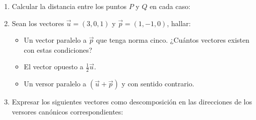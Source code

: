 \documentclass[11pt]{article}
\begin{document}
\begin{enumerate}[\hspace{-3mm}$1)$]
\item  Calcular la distancia entre los puntos $P$ y $Q$ en cada caso:

    \begin{enumerate}[a) ]
    \end{enumerate}






    

\item  Sean los vectores $\vec{u} = (3, 0, 1)$ y $\vec{p} = (1, -1, 0)$, hallar:

    \begin{itemize}
        \item[a)] Un vector paralelo a $\vec{p}$ que tenga norma cinco. ¿Cuántos vectores existen con estas condiciones?
        \item[b)] El vector opuesto a $\frac{1}{2}\vec{u}$.
        \item[c)] Un versor paralelo a $(\vec{u} + \vec{p})$ y con sentido contrario.
    \end{itemize}








\item  Expresar los siguientes vectores como descomposición en las direcciones de los versores canónicos correspondientes:

    \begin{itemize}
    \end{itemize}






















\end{enumerate}
\end{document}
